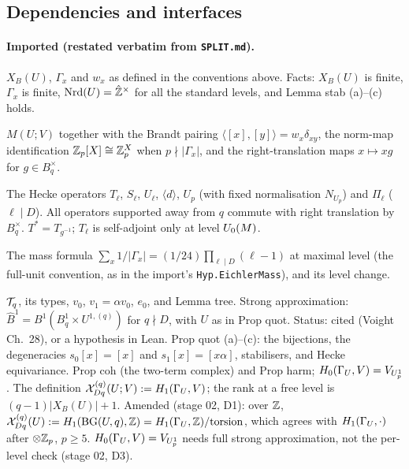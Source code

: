 \subsection{Dependencies and interfaces}
\paragraph{Imported (restated verbatim from \texttt{SPLIT.md}).}
\begin{interface}
$X_B(U)$, $\Gamma_x$ and $w_x$ as defined in the conventions above. Facts: $X_B(U)$ is finite, $\Gamma_x$ is finite,
$\mathrm{Nrd}(U)=\hat{\mathbb{Z}}^\times$ for all the standard levels, and Lemma stab (a)--(c) holds. 
\end{interface}
\begin{interface}
$M(U;V)$ together with the Brandt pairing $\langle[x],[y]\rangle=w_x\delta_{xy}$, the norm-map identification
$\mathbb{Z}_p[X]\cong\mathbb{Z}_p^X$ when $p\nmid|\Gamma_x|$, and the right-translation maps $x\mapsto xg$ for $g\in B_q^\times$.
\end{interface}
\begin{interface}
The Hecke operators $T_\ell$, $S_\ell$, $U_\ell$, $\langle d\rangle$, $U_p$ (with fixed normalisation $N_{U_p}$) and $\Pi_\ell$
($\ell\mid D$). All operators supported away from $q$ commute with right translation by $B_q^\times$. $T^*=T_{g^{-1}}$; $T_\ell$ is self-adjoint only at level $U_0(M)$.
\end{interface}
\begin{interface}
The mass formula $\sum_x1/|\Gamma_x|=(1/24)\prod_{\ell\mid D}(\ell-1)$ at maximal level (the full-unit convention, as in the
import's \texttt{Hyp.EichlerMass}), and its level change. 
\end{interface}
\begin{interface}
$\mathcal{T}_q$, its types, $v_0$, $v_1=\alpha v_0$, $e_0$, and Lemma tree. Strong approximation: $\hat B^1=B^1(B^1_q\times U^{1,(q)})$ for
$q\nmid D$, with $U$ as in Prop quot. Status: cited (Voight Ch.~28), or a hypothesis in Lean. Prop quot (a)--(c): the bijections,
the degeneracies $s_0[x]=[x]$ and $s_1[x]=[x\alpha]$, stabilisers, and Hecke equivariance. Prop coh (the two-term complex) and
Prop harm; $H_0(\Gamma_U,V)=V_{U_p^1}$. The definition $\mathcal{X}^{(q)}_{Dq}(U;V):=H_1(\Gamma_U,V)$; the rank at a free level is
$(q-1)|X_B(U)|+1$. Amended (stage 02, D1): over $\mathbb{Z}$, $\mathcal{X}^{(q)}_{Dq}(U):=H_1(\mathrm{BG}(U,q),\mathbb{Z})=H_1(\Gamma_U,\mathbb{Z})/\mathrm{torsion}$, which agrees
with $H_1(\Gamma_U,\cdot)$ after $\otimes\mathbb{Z}_p$, $p\ge5$. $H_0(\Gamma_U,V)=V_{U^1_p}$ needs full strong approximation, not the per-level check
(stage 02, D3). 
\end{interface}

